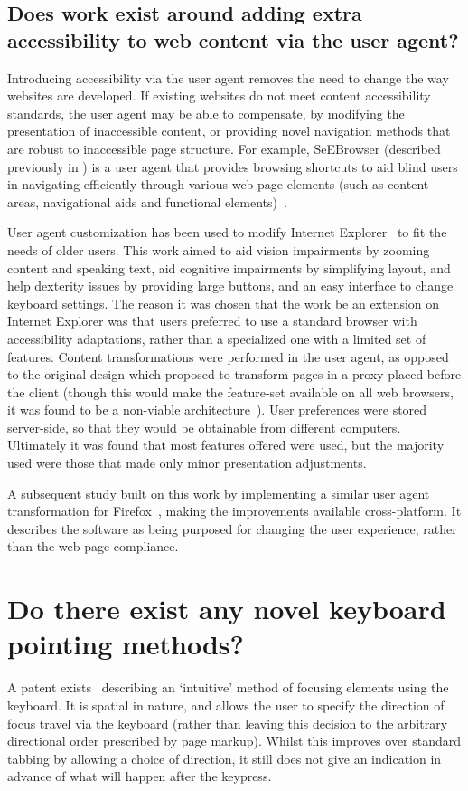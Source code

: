 \documentclass[11pt,openright,a4paper]{report}
\begin{document}
\subsection{Does work exist around adding extra accessibility to web content via the user agent?}
Introducing accessibility via the user agent removes the need to change the way websites are developed. If existing websites do not meet content accessibility standards, the user agent may be able to compensate, by modifying the presentation of inaccessible content, or providing novel navigation methods that are robust to inaccessible page structure. For example, SeEBrowser (described previously in ) is a user agent that provides browsing shortcuts to aid blind users in navigating efficiently through various web page elements (such as content areas, navigational aids and functional elements)~\cite{kouroupetroglou2007browsing}.

User agent customization has been used to modify Internet Explorer~\cite{hanson2005personalization} to fit the needs of older users. This work aimed to aid vision impairments by zooming content and speaking text, aid cognitive impairments by simplifying layout, and help dexterity issues by providing large buttons, and an easy interface to change keyboard settings. The reason it was chosen that the work be an extension on Internet Explorer was that users preferred to use a standard browser with accessibility adaptations, rather than a specialized one with a limited set of features. Content transformations were performed in the user agent, as opposed to the original design which proposed to transform pages in a proxy placed before the client (though this would make the feature-set available on all web browsers, it was found to be a non-viable architecture~\cite{fairweather2002distributed,czaja2002designing,hanson2005achieving}). User preferences were stored server-side, so that they would be obtainable from different computers. Ultimately it was found that most features offered were used, but the majority used were those that made only minor presentation adjustments.

A subsequent study built on this work by implementing a similar user agent transformation for Firefox~\cite{hanson2005improving}, making the improvements available cross-platform. It describes the software as being purposed for changing the user experience, rather than the web page compliance.
\section{Do there exist any novel keyboard pointing methods?}
\label{novelpointing}
A patent exists~\cite{Mouyade:2011:EP2385452} describing an `intuitive' method of focusing elements using the keyboard. It is spatial in nature, and allows the user to specify the direction of focus travel via the keyboard (rather than leaving this decision to the arbitrary directional order prescribed by page markup). Whilst this improves over standard tabbing by allowing a choice of direction, it still does not give an indication in advance of what will happen after the keypress.
\end{document}
